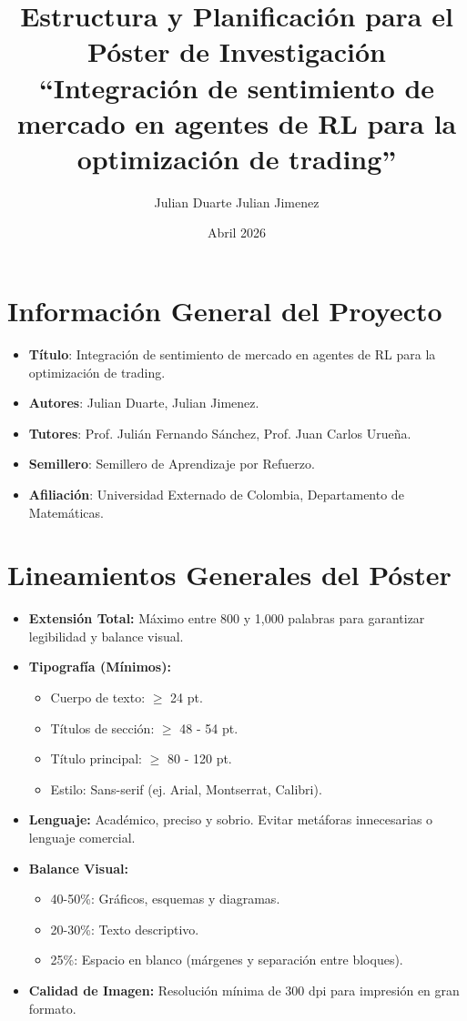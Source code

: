 \documentclass[12pt, a4paper]{article}
\title{Estructura y Planificación para el Póster de Investigación \\ \large ``Integración de sentimiento de mercado en agentes de RL para la optimización de trading''}
\author{Julian Duarte \quad Julian Jimenez}
\date{Abril 2026}
\begin{document}
\maketitle

\section{Información General del Proyecto}
\begin{itemize}
    \item \textbf{Título}: Integración de sentimiento de mercado en agentes de RL para la optimización de trading.
    \item \textbf{Autores}: Julian Duarte, Julian Jimenez.
    \item \textbf{Tutores}: Prof. Julián Fernando Sánchez, Prof. Juan Carlos Urueña.
    \item \textbf{Semillero}: Semillero de Aprendizaje por Refuerzo.
    \item \textbf{Afiliación}: Universidad Externado de Colombia, Departamento de Matemáticas.
\end{itemize}

\section{Lineamientos Generales del Póster}

\begin{itemize}
    \item \textbf{Extensión Total:} Máximo entre 800 y 1,000 palabras para garantizar legibilidad y balance visual.
    \item \textbf{Tipografía (Mínimos):}
        \begin{itemize}
            \item Cuerpo de texto: $\ge$ 24 pt.
            \item Títulos de sección: $\ge$ 48 - 54 pt.
            \item Título principal: $\ge$ 80 - 120 pt.
            \item Estilo: Sans-serif (ej. Arial, Montserrat, Calibri).
        \end{itemize}
    \item \textbf{Lenguaje:} Académico, preciso y sobrio. Evitar metáforas innecesarias o lenguaje comercial.
    \item \textbf{Balance Visual:}
        \begin{itemize}
            \item 40-50\%: Gráficos, esquemas y diagramas.
            \item 20-30\%: Texto descriptivo.
            \item 25\%: Espacio en blanco (márgenes y separación entre bloques).
        \end{itemize}
    \item \textbf{Calidad de Imagen:} Resolución mínima de 300 dpi para impresión en gran formato.
\end{itemize}
\end{document}
